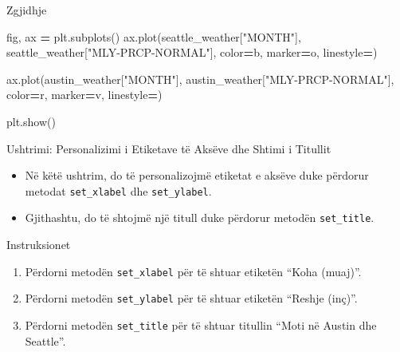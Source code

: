 \documentclass[
  ignorenonframetext,
]{beamer}
\newenvironment{Shaded}{\begin{snugshade}}{\end{snugshade}}
\newcommand{\NormalTok}[1]{#1}
\newcommand{\OperatorTok}[1]{\textcolor[rgb]{0.81,0.36,0.00}{\textbf{#1}}}
\newcommand{\StringTok}[1]{\textcolor[rgb]{0.31,0.60,0.02}{#1}}
\begin{document}
\begin{frame}[fragile]{Zgjidhje}
\protect\hypertarget{zgjidhje-2}{}

\begin{Shaded}
\begin{Highlighting}[]
\NormalTok{fig, ax }\OperatorTok{=}\NormalTok{ plt.subplots()}
\NormalTok{ax.plot(seattle\_weather[}\StringTok{"MONTH"}\NormalTok{], seattle\_weather[}\StringTok{"MLY{-}PRCP{-}NORMAL"}\NormalTok{],}
\NormalTok{        color}\OperatorTok{=}\StringTok{\textquotesingle{}b\textquotesingle{}}\NormalTok{, marker}\OperatorTok{=}\StringTok{\textquotesingle{}o\textquotesingle{}}\NormalTok{, linestyle}\OperatorTok{=}\StringTok{\textquotesingle{}{-}{-}\textquotesingle{}}\NormalTok{)}

\NormalTok{ax.plot(austin\_weather[}\StringTok{"MONTH"}\NormalTok{], austin\_weather[}\StringTok{"MLY{-}PRCP{-}NORMAL"}\NormalTok{],}
\NormalTok{        color}\OperatorTok{=}\StringTok{\textquotesingle{}r\textquotesingle{}}\NormalTok{, marker}\OperatorTok{=}\StringTok{\textquotesingle{}v\textquotesingle{}}\NormalTok{, linestyle}\OperatorTok{=}\StringTok{\textquotesingle{}{-}{-}\textquotesingle{}}\NormalTok{)}

\NormalTok{plt.show()}
\end{Highlighting}
\end{Shaded}
\end{frame}

\begin{frame}[fragile]{Ushtrimi: Personalizimi i Etiketave të Aksëve dhe
Shtimi i Titullit}
\protect\hypertarget{ushtrimi-personalizimi-i-etiketave-tuxeb-aksuxebve-dhe-shtimi-i-titullit}{}
\begin{itemize}
\item
  Në këtë ushtrim, do të personalizojmë etiketat e aksëve duke përdorur
  metodat \texttt{set\_xlabel} dhe \texttt{set\_ylabel}.
\item
  Gjithashtu, do të shtojmë një titull duke përdorur metodën
  \texttt{set\_title}.
\end{itemize}
\end{frame}

\begin{frame}[fragile]{Instruksionet}
\protect\hypertarget{instruksionet-3}{}
\begin{enumerate}
\item
  Përdorni metodën \texttt{set\_xlabel} për të shtuar etiketën ``Koha
  (muaj)''.
\item
  Përdorni metodën \texttt{set\_ylabel} për të shtuar etiketën ``Reshje
  (inç)''.
\item
  Përdorni metodën \texttt{set\_title} për të shtuar titullin ``Moti në
  Austin dhe Seattle''.
\end{enumerate}
\end{frame}
\end{document}
